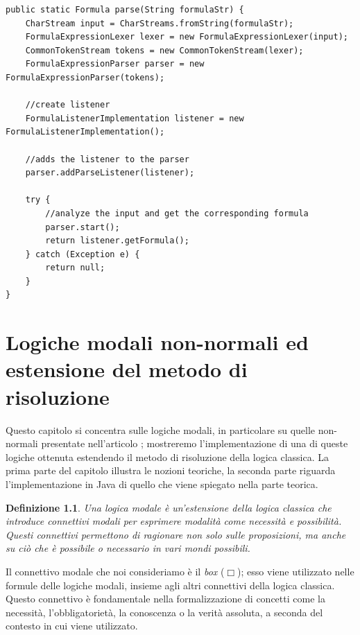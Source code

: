 \documentclass[a4paper,12pt]{report}
\newtheorem{definition}{Definizione}[section]
\begin{document}
\begin{minipage}{\linewidth}
    \begin{lstlisting}[caption={Metodo \texttt{parse} della classe \texttt{ParseFormula}}, label={parse}]
public static Formula parse(String formulaStr) {
    CharStream input = CharStreams.fromString(formulaStr);
    FormulaExpressionLexer lexer = new FormulaExpressionLexer(input);
    CommonTokenStream tokens = new CommonTokenStream(lexer);
    FormulaExpressionParser parser = new FormulaExpressionParser(tokens);

    //create listener
    FormulaListenerImplementation listener = new FormulaListenerImplementation();

    //adds the listener to the parser
    parser.addParseListener(listener);

    try {
        //analyze the input and get the corresponding formula
        parser.start();
        return listener.getFormula();
    } catch (Exception e) {
        return null;
    }
}
    \end{lstlisting}
\end{minipage}


% 
% 
\chapter{Logiche modali non-normali ed estensione del metodo di risoluzione}
\label{modal}
Questo capitolo si concentra sulle logiche modali, in particolare su quelle non-normali presentate nell'articolo \cite{Articolo_resolution}; mostreremo l'implementazione di una di queste logiche ottenuta estendendo il metodo di risoluzione della logica classica. La prima parte del capitolo illustra le nozioni teoriche, la seconda parte riguarda l'implementazione in Java di quello che viene spiegato nella parte teorica. 

\begin{definition}
    Una logica modale è un'estensione della logica classica che introduce connettivi modali per esprimere modalità come necessità e possibilità. Questi connettivi permettono di ragionare non solo sulle proposizioni, ma anche su ciò che è possibile o necessario in vari mondi possibili.
\end{definition}
Il connettivo modale che noi consideriamo è il \emph{box} ($\Box$); esso viene utilizzato nelle formule delle logiche modali, insieme agli altri connettivi della logica classica. Questo connettivo è fondamentale nella formalizzazione di concetti come la necessità, l'obbligatorietà, la conoscenza o la verità assoluta, a seconda del contesto in cui viene utilizzato.
\end{document}
